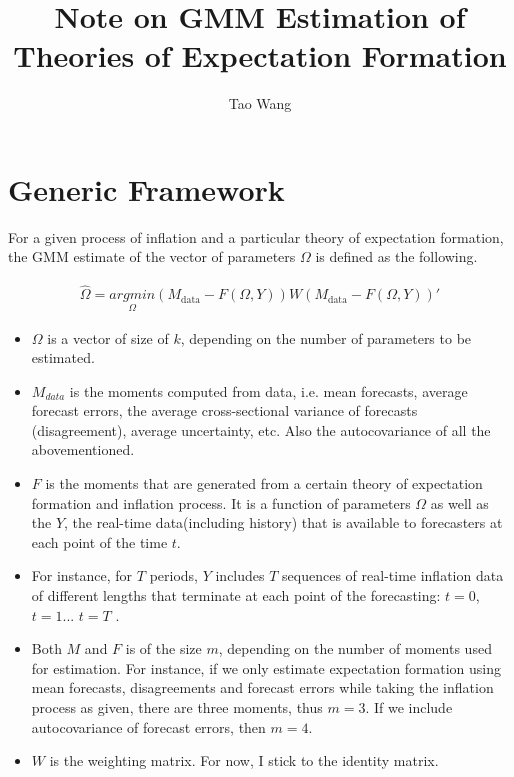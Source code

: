 \documentclass[]{article}
\title{Note on GMM Estimation of Theories of Expectation Formation}
\author{Tao Wang}
\begin{document}
\maketitle

\section{Generic Framework}

For a given process of inflation and a particular theory of expectation formation, the GMM estimate of the vector of parameters $\Omega$ is defined as the following. 

\begin{eqnarray}
\widehat \Omega = \underset{\Omega }{argmin} (M_{\textrm{data} } - F(\Omega, Y)) W  (M_{\textrm{data} } - F(\Omega, Y))'
\end{eqnarray}

\begin{itemize}
	\item  $\Omega$ is a vector of size of $k$, depending on the number of parameters to be estimated. 
	\item $M_{data}$ is the moments computed from data, i.e. mean forecasts, average forecast errors, the average cross-sectional variance of forecasts (disagreement), average uncertainty, etc. Also the autocovariance of all the abovementioned.  
	
	\item $F$ is the moments that are generated from a certain theory of expectation formation and inflation process. It is a function of parameters $\Omega$ as well as the $Y$, the real-time data(including history) that is available to forecasters at each point of the time $t$. 
	\item For instance, for $T$ periods, $Y$ includes $T$  sequences of real-time inflation data of different lengths that terminate at each point of the forecasting:  $t =0$, $t=1$... $t=T$ . 
	\item  Both $M$ and $F$ is of the size  $m$, depending on the number of moments used for estimation. For instance, if we only estimate expectation formation using mean forecasts, disagreements and forecast errors while taking the inflation process as given, there are three moments, thus $m = 3$. If we include autocovariance of forecast errors, then $m=4$.  
	
	\item $W$ is the weighting matrix. For now, I stick to the identity matrix. 
\end{itemize}
\end{document}
